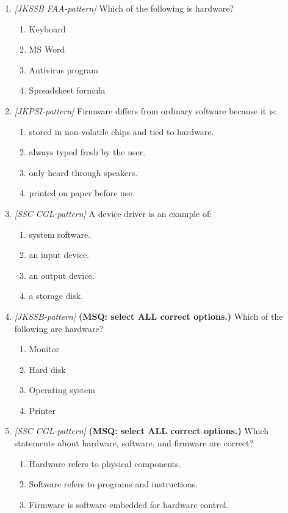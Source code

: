 \begin{enumerate}[label=\textbf{Q\arabic*.}, leftmargin=*]
\item \textit{[JKSSB FAA-pattern]} Which of the following is hardware?
  \begin{enumerate}[label=\Alph*.]
    \item Keyboard
    \item MS Word
    \item Antivirus program
    \item Spreadsheet formula
  \end{enumerate}
\item \textit{[JKPSI-pattern]} Firmware differs from ordinary software because it is:
  \begin{enumerate}[label=\Alph*.]
    \item stored in non-volatile chips and tied to hardware.
    \item always typed fresh by the user.
    \item only heard through speakers.
    \item printed on paper before use.
  \end{enumerate}
\item \textit{[SSC CGL-pattern]} A device driver is an example of:
  \begin{enumerate}[label=\Alph*.]
    \item system software.
    \item an input device.
    \item an output device.
    \item a storage disk.
  \end{enumerate}
\item \textit{[JKSSB-pattern]} \textbf{(MSQ: select ALL correct options.)} Which of the following are hardware?
  \begin{enumerate}[label=\Alph*.]
    \item Monitor
    \item Hard disk
    \item Operating system
    \item Printer
  \end{enumerate}
\item \textit{[SSC CGL-pattern]} \textbf{(MSQ: select ALL correct options.)} Which statements about hardware, software, and firmware are correct?
  \begin{enumerate}[label=\Alph*.]
    \item Hardware refers to physical components.
    \item Software refers to programs and instructions.
    \item Firmware is software embedded for hardware control.

\end{enumerate}
\end{enumerate}
